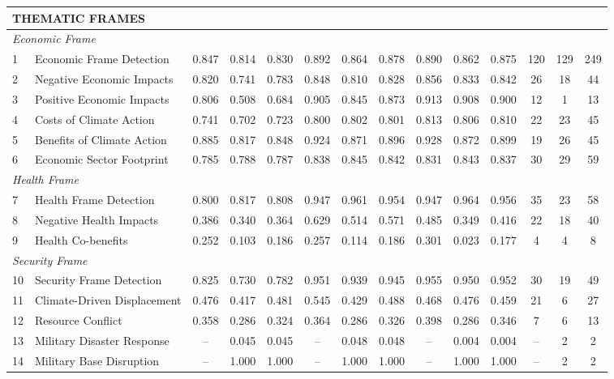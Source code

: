{\begin{longtable}{p{0.4cm}p{5.5cm}cccccccccccc}
\multicolumn{14}{l}{\cellcolor{gray!10}\textbf{THEMATIC FRAMES}} \\
\midrule
\multicolumn{14}{l}{\textit{Economic Frame}} \\
1 & Economic Frame Detection & 0.847 & 0.814 & 0.830 & 0.892 & 0.864 & 0.878 & 0.890 & 0.862 & 0.875 & 120 & 129 & 249 \\
2 & Negative Economic Impacts & 0.820 & 0.741 & 0.783 & 0.848 & 0.810 & 0.828 & 0.856 & 0.833 & 0.842 & 26 & 18 & 44 \\
3 & Positive Economic Impacts & 0.806 & 0.508 & 0.684 & 0.905 & 0.845 & 0.873 & 0.913 & 0.908 & 0.900 & 12 & 1 & 13 \\
4 & Costs of Climate Action & 0.741 & 0.702 & 0.723 & 0.800 & 0.802 & 0.801 & 0.813 & 0.806 & 0.810 & 22 & 23 & 45 \\
5 & Benefits of Climate Action & 0.885 & 0.817 & 0.848 & 0.924 & 0.871 & 0.896 & 0.928 & 0.872 & 0.899 & 19 & 26 & 45 \\
6 & Economic Sector Footprint & 0.785 & 0.788 & 0.787 & 0.838 & 0.845 & 0.842 & 0.831 & 0.843 & 0.837 & 30 & 29 & 59 \\
\midrule
\multicolumn{14}{l}{\textit{Health Frame}} \\
7 & Health Frame Detection & 0.800 & 0.817 & 0.808 & 0.947 & 0.961 & 0.954 & 0.947 & 0.964 & 0.956 & 35 & 23 & 58 \\
8 & Negative Health Impacts & 0.386 & 0.340 & 0.364 & 0.629 & 0.514 & 0.571 & 0.485 & 0.349 & 0.416 & 22 & 18 & 40 \\
9 & Health Co-benefits & 0.252 & 0.103 & 0.186 & 0.257 & 0.114 & 0.186 & 0.301 & 0.023 & 0.177 & 4 & 4 & 8 \\
\midrule
\multicolumn{14}{l}{\textit{Security Frame}} \\
10 & Security Frame Detection & 0.825 & 0.730 & 0.782 & 0.951 & 0.939 & 0.945 & 0.955 & 0.950 & 0.952 & 30 & 19 & 49 \\
11 & Climate-Driven Displacement & 0.476 & 0.417 & 0.481 & 0.545 & 0.429 & 0.488 & 0.468 & 0.476 & 0.459 & 21 & 6 & 27 \\
12 & Resource Conflict & 0.358 & 0.286 & 0.324 & 0.364 & 0.286 & 0.326 & 0.398 & 0.286 & 0.346 & 7 & 6 & 13 \\
13 & Military Disaster Response & -- & 0.045 & 0.045 & -- & 0.048 & 0.048 & -- & 0.004 & 0.004 & -- & 2 & 2 \\
14 & Military Base Disruption & -- & 1.000 & 1.000 & -- & 1.000 & 1.000 & -- & 1.000 & 1.000 & -- & 2 & 2 \\
\midrule

\end{longtable}}
